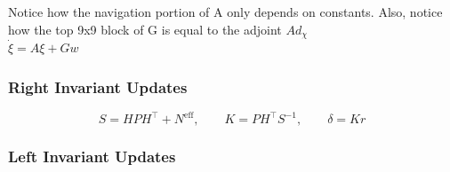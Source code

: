 Notice how the navigation portion of A only depends on constants. Also, notice how the top 9x9 block of G is equal to the adjoint $Ad_\chi$\\
$\dot \xi = A \xi+Gw$
\subsubsection{Right Invariant Updates}
$$S = HPH^\top + N^{\text{eff}}, \qquad K = PH^\top S^{-1}, \qquad \delta = K{r}$$
\subsubsection{Left Invariant Updates}
$$


